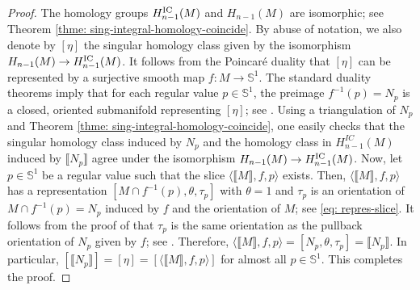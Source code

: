 \documentclass{amsart}
\numberwithin{equation}{section}
\newcommand{\Z}{\mathbb{Z}}
\newcommand{\bb}[1]{\llbracket #1\rrbracket}
\begin{document}
    \begin{proof}
        The homology groups $H_{n-1}^\textup{IC}(M)$ and $H_{n-1}(M)$ are isomorphic; see Theorem \ref{thme: sing-integral-homology-coincide}. By abuse of notation, we also denote by $[\eta]$ the singular homology class given by the isomorphism $H_{n-1}(M) \to H_{n-1}^\textup{IC}(M)$. 
        It follows from the Poincar\'e duality that $[\eta]$ can be represented by a surjective smooth map $f\colon M \to \mathbb{S}^1$. The standard duality theorems imply that for each regular value $p \in \mathbb{S}^1$, the preimage $f^{-1}(p) = N_p$ is a closed, oriented submanifold representing $[\eta]$; see \cite{Meeks-codimension-one-homol}. Using a triangulation of $N_p$ and Theorem \ref{thme: sing-integral-homology-coincide}, one easily checks that the singular homology class induced by $N_p$ and the homology class in $H_{n-1}^{IC}(M)$ induced by $\bb{N_p}$ agree under the isomorphism $H_{n-1}(M) \to H_{n-1}^\textup{IC}(M)$. Now, let $p\in \mathbb{S}^1$ be a regular value such that the slice $\langle \bb{M},f,p\rangle$ exists. Then, $\langle \bb{M},f,p\rangle$ has a representation $[M \cap f^{-1}(p),\theta,\tau_p]$ with $\theta = 1$ and $\tau_p$ is an orientation of $M\cap f^{-1}(p) = N_p$ induced by $f$ and the orientation of $M$; see \eqref{eq: repres-slice}. It follows from the proof of \cite[Theorem 9.7]{ambrosio-kirchheim-2000} that $\tau_p$ is the same orientation as the pullback orientation of $N_p$ given by $f$; see \cite[p. 100]{Guillemin-Pollack-Differential-topology}. Therefore, $\langle \bb{M},f,p\rangle = [N_p, \theta, \tau_p] = \bb{N_p}$. In particular, $[ \bb{N_p} ] =  [\eta] = [\langle \bb{M},f,p\rangle]$ for almost all $p \in \mathbb{S}^1$. This completes the proof. 
    \end{proof}
\end{document}
